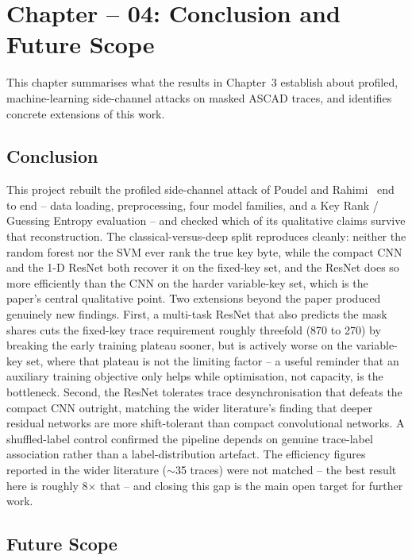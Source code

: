 \clearpage
\section[Conclusion and Future Scope]{Chapter -- 04: Conclusion and Future Scope}

This chapter summarises what the results in Chapter~3 establish about profiled,
machine-learning side-channel attacks on masked ASCAD traces, and identifies concrete
extensions of this work.

\subsection{Conclusion}

This project rebuilt the profiled side-channel attack of Poudel and
Rahimi~\cite{poudel2025} end to end -- data loading, preprocessing, four model
families, and a Key Rank / Guessing Entropy evaluation -- and checked which of its
qualitative claims survive that reconstruction. The classical-versus-deep split
reproduces cleanly: neither the random forest nor the SVM ever rank the true key
byte, while the compact CNN and the 1-D ResNet both recover it on the fixed-key set,
and the ResNet does so more efficiently than the CNN on the harder variable-key set,
which is the paper's central qualitative point. Two extensions beyond the paper
produced genuinely new findings. First, a multi-task ResNet that also predicts the
mask shares cuts the fixed-key trace requirement roughly threefold (870 to 270) by
breaking the early training plateau sooner, but is actively worse on the
variable-key set, where that plateau is not the limiting factor -- a useful reminder
that an auxiliary training objective only helps while optimisation, not capacity, is
the bottleneck. Second, the ResNet tolerates trace desynchronisation that defeats the
compact CNN outright, matching the wider literature's finding that deeper residual
networks are more shift-tolerant than compact convolutional networks. A
shuffled-label control confirmed the pipeline depends on genuine trace-label
association rather than a label-distribution artefact. The efficiency figures
reported in the wider literature ($\sim$35 traces) were not matched -- the best
result here is roughly 8$\times$ that -- and closing this gap is the main open target
for further work.

\subsection{Future Scope}

